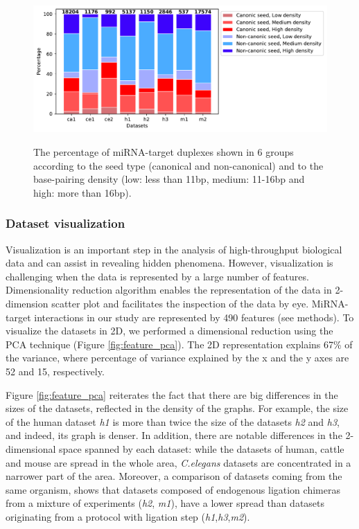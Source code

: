 \documentclass{bmcart}
\begin{document}
\begin{figure}[h!]
  \caption{ The percentage of miRNA-target duplexes shown in 6 groups according to the seed type (canonical and non-canonical) and to the base-pairing density (low: less than 11bp, medium: 11-16bp and high: more than 16bp).}
    \includegraphics[width = 1\textwidth]{Results/seed_type_positive2.pdf}
      \label{fig:seed_type_pos}
      \end{figure}


\subsubsection*{Dataset visualization}
Visualization is an important step in the analysis of high-throughput biological data and can assist in revealing hidden phenomena. However, visualization is challenging when the data is represented by a large number of features. Dimensionality reduction algorithm enables the representation of the data in 2-dimension scatter plot and facilitates the inspection of the data by eye. MiRNA-target interactions in our study are represented by 490 features (see methods). To visualize the datasets in 2D, we performed a dimensional reduction using the PCA technique (Figure \ref{fig:feature_pca}). The 2D representation explains 67\% of the variance, where percentage of variance explained by the x and the y axes are 52 and 15, respectively. 

Figure \ref{fig:feature_pca} reiterates the fact that there are big differences in the sizes of the datasets, reflected in the density of the graphs. For example, the size of the human dataset \textit{h1} is more than twice the size of the datasets \textit{h2} and \textit{h3}, and indeed, its graph is denser. In addition, there are notable differences in the 2-dimensional space spanned by each dataset: while the datasets of human, cattle and mouse are spread in the whole area, \textit{C.elegans} datasets are concentrated in a narrower part of the area. Moreover, a comparison of datasets coming from the same organism, shows that datasets composed of endogenous ligation chimeras from a mixture of experiments (\textit{h2}, \textit{m1}), have a lower spread than datasets originating from a protocol with ligation step (\textit{h1},\textit{h3},\textit{m2}).
\end{document}
